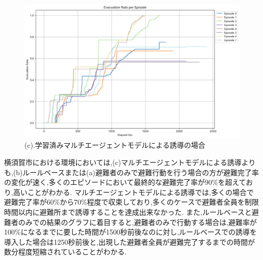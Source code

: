 \begin{figure}[H]
  \vspace{1em} %
  \begin{minipage}{0.65\textwidth}
      \centering
      \includegraphics[width=\textwidth]{Figures/Yokosuka-AgentModel-ERE.png} %
      \caption{(c).学習済みマルチエージェントモデルによる誘導の場合}
      \label{fig:yokosuka-guidgraph-c}
  \end{minipage}
\end{figure}
横須賀市における環境においては,(c)マルチエージェントモデルによる誘導よりも,(b)ルールベースまたは(a)避難者のみで避難行動を行う場合の方が避難完了率の変化が速く,多くのエピソードにおいて最終的な避難完了率が$90\%$を超えており,高いことがわかる.
マルチエージェントモデルによる誘導では,多くの場合で避難完了率が60\%から70\%程度で収束しており,多くのケースで避難者全員を制限時間以内に避難所まで誘導することを達成出来なかった.
また,ルールベースと避難者のみでの結果のグラフに着目すると,避難者のみで行動する場合は,避難率が100\%になるまでに要した時間が1500秒前後なのに対し,ルールベースでの誘導を導入した場合は1250秒前後と,出現した避難者全員が避難完了するまでの時間が数分程度短縮されていることがわかる.\par

